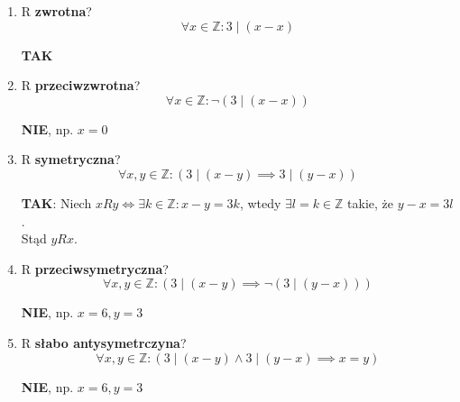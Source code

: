 \documentclass[a5paper,8pt]{article}
\theoremstyle{mythmstyle}
\begin{document}
            \begin{enumerate}
                \item R \textbf{zwrotna}?
                    \begin{equation*}
                        \forall x \in \mathbb{Z}: 3 \mid (x - x)
                    \end{equation*}
                    \begin{center}
                        \textbf{TAK}
                    \end{center}

                \item R \textbf{przeciwzwrotna}?
                    \begin{equation*}
                        \forall x \in \mathbb{Z}: \neg (3 \mid (x - x))
                    \end{equation*}
                    \begin{center}
                        \textbf{NIE}, np. $ x = 0 $
                    \end{center}

                \item R \textbf{symetryczna}?
                    \begin{equation*}
                        \forall x, y \in \mathbb{Z}: (3 \mid (x - y) \implies 3 \mid (y - x) )
                    \end{equation*}
                    \begin{center}
                        \textbf{TAK}: Niech $ x R y \iff \exists k \in \mathbb{Z} : x - y = 3k $,
                                      wtedy $ \exists l = k \in \mathbb{Z} $ takie, że $ y - x = 3l $. \\
                                      Stąd $ y R x $.
                    \end{center}

                \item R \textbf{przeciwsymetryczna}?
                    \begin{equation*}
                        \forall x, y \in \mathbb{Z}: ( 3 \mid (x - y) \implies \neg (3 \mid (y - x)) )
                    \end{equation*}
                    \begin{center}
                        \textbf{NIE}, np. $ x = 6, y = 3 $
                    \end{center}

                \item R \textbf{słabo antysymetrczyna}?
                    \begin{equation*}
                        \forall x, y \in \mathbb{Z}: ( 3 \mid (x - y) \wedge 3 \mid (y - x) \implies x = y )
                    \end{equation*}
                    \begin{center}
                        \textbf{NIE}, np. $ x = 6, y = 3 $
                    \end{center}


\end{enumerate}
\end{document}
